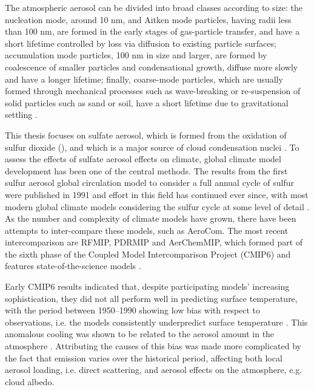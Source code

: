 The atmospheric aerosol can be divided into broad classes according to size: the nucleation mode, around 10 nm, and Aitken mode particles, having radii less than 100 nm, are formed in the early stages of gas-particle transfer, and have a short lifetime controlled by loss via diffusion to existing particle surfaces; accumulation mode particles, 100 nm in size and larger, are formed by coalescence of smaller particles and condensational growth, diffuse more slowly and have a longer lifetime; finally, coarse-mode particles, which are usually formed through mechanical processes such as wave-breaking or re-suspension of solid particles such as sand or soil, have a short lifetime due to gravitational settling \citep{seinfeldAtmosphericChemistryPhysics2016}.

This thesis focuses on sulfate aerosol, which is formed from the oxidation of sulfur dioxide (), and which is a major source of cloud condensation nuclei \citep{boucherCloudsAerosols2014}. To assess the effects of sulfate aerosol effects on climate, global climate model development has been one of the central methods. The results from the first sulfur aerosol global circulation model to consider a full annual cycle of sulfur were published in 1991 and effort in this field has continued ever since, with most modern global climate models considering the sulfur cycle at some level of detail \citep{langnerGlobalThreedimensionalModel1991, liAssessmentCoupledModel2021}. As the number and complexity of climate models have grown, there have been attempts to inter-compare these models, such as AeroCom. The most recent intercomparison are RFMIP, PDRMIP and AerChemMIP, which formed part of the sixth phase of the Coupled Model Intercomparison Project (CMIP6) and features state-of-the-science models \citep[e.g.][]{eyringOverviewCoupledModel2016, collinsAerChemMIPQuantifyingEffects2017, gillettDetectionAttributionModel2016}. 

Early CMIP6 results indicated that, despite participating models' increasing sophistication, they did not all perform well in predicting surface temperature, with the period between 1950--1990 showing low bias with respect to observations, i.e. the models consistently underpredict surface temperature \citep{flynnClimateSensitivityHistorical2020, zhangRoleAnthropogenicAerosols2021}. This anomalous cooling was shown to be related to the aerosol amount in the atmosphere \citep{zhangRoleAnthropogenicAerosols2021}. Attributing the causes of this bias was made more complicated by the fact that  emission varies over the historical period, affecting both local aerosol loading, i.e. direct scattering, and aerosol effects on the atmosphere, e.g. cloud albedo.


